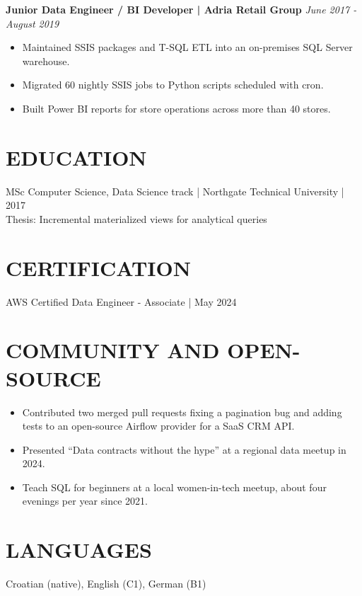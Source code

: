 \documentclass[11pt,a4paper]{article}
\begin{document}
\textbf{Junior Data Engineer / BI Developer | Adria Retail Group} \hfill \textit{June 2017 - August 2019}
\begin{itemize}
\item Maintained SSIS packages and T-SQL ETL into an on-premises SQL Server warehouse.
\item Migrated 60 nightly SSIS jobs to Python scripts scheduled with cron.
\item Built Power BI reports for store operations across more than 40 stores.
\end{itemize}

\section*{EDUCATION}
MSc Computer Science, Data Science track | Northgate Technical University | 2017\\
Thesis: Incremental materialized views for analytical queries

\section*{CERTIFICATION}
AWS Certified Data Engineer - Associate | May 2024

\section*{COMMUNITY AND OPEN-SOURCE}
\begin{itemize}
\item Contributed two merged pull requests fixing a pagination bug and adding tests to an open-source Airflow provider for a SaaS CRM API.
\item Presented “Data contracts without the hype” at a regional data meetup in 2024.
\item Teach SQL for beginners at a local women-in-tech meetup, about four evenings per year since 2021.
\end{itemize}

\section*{LANGUAGES}
Croatian (native), English (C1), German (B1)
\end{document}
